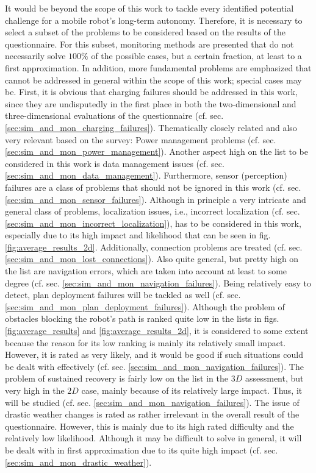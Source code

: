 \documentclass[english, master, utf8]{base/thesis_KBS}
\begin{document}
\noindent
It would be beyond the scope of this work to tackle every identified potential challenge for a mobile robot's long-term autonomy. Therefore, it is necessary to select a subset of the
problems to be considered based on the results of the questionnaire. For this subset, monitoring methods are presented that do not necessarily solve $100\%$ of the possible cases,
but a certain fraction, at least to a first approximation. In addition, more fundamental problems are emphasized that cannot be addressed in general within the scope of this work;
special cases may be. 
First, it is obvious that charging failures should be addressed in this work, since they are undisputedly in the first place in both the two-dimensional and three-dimensional
evaluations of the questionnaire (cf. sec. \ref{sec:sim_and_mon_charging_failures}). Thematically closely related and also very relevant based on the survey:
Power management problems (cf. sec. \ref{sec:sim_and_mon_power_management}). Another aspect high on the list to be considered in this work is data management
issues (cf. sec. \ref{sec:sim_and_mon_data_management}). Furthermore, sensor (perception) failures are a class of problems that should not be ignored in this work
(cf. sec. \ref{sec:sim_and_mon_sensor_failures}). Although in principle a very intricate and general class of problems, localization issues, i.e., incorrect
localization (cf. sec. \ref{sec:sim_and_mon_incorrect_localization}), has to be considered in this work, especially due to its high impact and likelihood
that can be seen in fig. \ref{fig:average_results_2d}. Additionally, connection problems are treated (cf. sec. \ref{sec:sim_and_mon_lost_connections}). Also quite
general, but pretty high on the list are navigation errors, which are taken into account at least to some degree (cf. sec. \ref{sec:sim_and_mon_navigation_failures}). Being relatively easy to detect, plan deployment failures will be tackled as well (cf. sec. \ref{sec:sim_and_mon_plan_deployment_failures}). Although the problem of obstacles blocking the robot's path is ranked quite low in the lists in figs. \ref{fig:average_results} and
\ref{fig:average_results_2d}, it is considered to some extent because the reason for its low ranking is mainly its relatively small impact. However, it is rated as very likely,
and it would be good if such situations could be dealt with effectively (cf. sec. \ref{sec:sim_and_mon_navigation_failures}). The problem of sustained recovery is fairly low on
the list in the $3D$ assessment, but very high in the $2D$ case, mainly because of its relatively large impact. Thus, it will be studied (cf. sec. \ref{sec:sim_and_mon_navigation_failures}). The issue of drastic weather changes is rated as rather irrelevant in the overall result of the questionnaire. However, this is mainly due to
its high rated difficulty and the relatively low likelihood. Although it may be difficult to solve in general, it will be dealt with in first approximation due to its quite high
impact (cf. sec. \ref{sec:sim_and_mon_drastic_weather}).\newline
\end{document}
